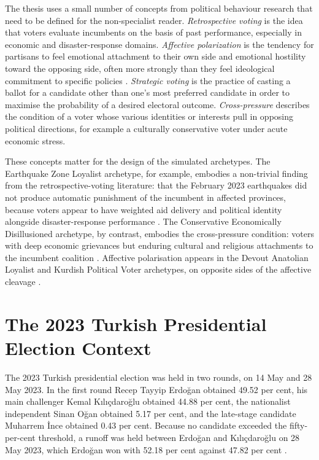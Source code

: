 \documentclass[12pt,a4paper]{report}
\begin{document}
The thesis uses a small number of concepts from political behaviour research that need to be defined for the non-specialist reader. \emph{Retrospective voting} is the idea that voters evaluate incumbents on the basis of past performance, especially in economic and disaster-response domains. \emph{Affective polarization} is the tendency for partisans to feel emotional attachment to their own side and emotional hostility toward the opposing side, often more strongly than they feel ideological commitment to specific policies \citep{aytac2025polarised}. \emph{Strategic voting} is the practice of casting a ballot for a candidate other than one's most preferred candidate in order to maximise the probability of a desired electoral outcome. \emph{Cross-pressure} describes the condition of a voter whose various identities or interests pull in opposing political directions, for example a culturally conservative voter under acute economic stress.

These concepts matter for the design of the simulated archetypes. The Earthquake Zone Loyalist archetype, for example, embodies a non-trivial finding from the retrospective-voting literature: that the February 2023 earthquakes did not produce automatic punishment of the incumbent in affected provinces, because voters appear to have weighted aid delivery and political identity alongside disaster-response performance \citep{sevinc2024afet}. The Conservative Economically Disillusioned archetype, by contrast, embodies the cross-pressure condition: voters with deep economic grievances but enduring cultural and religious attachments to the incumbent coalition \citep{carkoglu2024unlikely,yildirim2025sege}. Affective polarisation appears in the Devout Anatolian Loyalist and Kurdish Political Voter archetypes, on opposite sides of the affective cleavage \citep{aytac2025polarised,baruh2024difficult}.

\section{The 2023 Turkish Presidential Election Context}
\label{sec:context}

The 2023 Turkish presidential election was held in two rounds, on 14 May and 28 May 2023. In the first round Recep Tayyip Erdoğan obtained 49.52 per cent, his main challenger Kemal Kılıçdaroğlu obtained 44.88 per cent, the nationalist independent Sinan Oğan obtained 5.17 per cent, and the late-stage candidate Muharrem İnce obtained 0.43 per cent. Because no candidate exceeded the fifty-per-cent threshold, a runoff was held between Erdoğan and Kılıçdaroğlu on 28 May 2023, which Erdoğan won with 52.18 per cent against 47.82 per cent \citep{ysk2023}.
\end{document}
